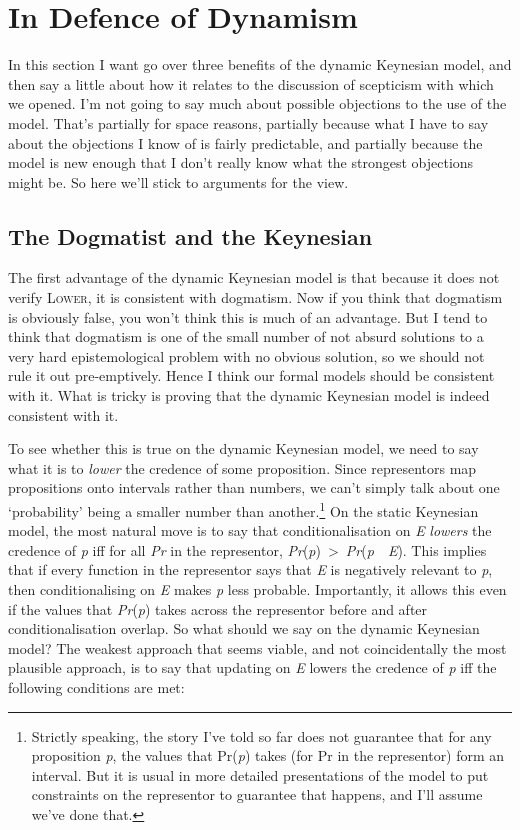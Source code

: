 \documentclass[
  11pt,
  letterpaper,
  DIV=11,
  numbers=noendperiod,
  oneside]{scrartcl}
\begin{document}
\section{In Defence of Dynamism}\label{in-defence-of-dynamism}

In this section I want go over three benefits of the dynamic Keynesian
model, and then say a little about how it relates to the discussion of
scepticism with which we opened. I'm not going to say much about
possible objections to the use of the model. That's partially for space
reasons, partially because what I have to say about the objections I
know of is fairly predictable, and partially because the model is new
enough that I don't really know what the strongest objections might be.
So here we'll stick to arguments for the view.

\subsection{The Dogmatist and the
Keynesian}\label{the-dogmatist-and-the-keynesian}

The first advantage of the dynamic Keynesian model is that because it
does not verify \textsc{Lower}, it is consistent with dogmatism. Now if
you think that dogmatism is obviously false, you won't think this is
much of an advantage. But I tend to think that dogmatism is one of the
small number of not absurd solutions to a very hard epistemological
problem with no obvious solution, so we should not rule it out
pre-emptively. Hence I think our formal models should be consistent with
it. What is tricky is proving that the dynamic Keynesian model is indeed
consistent with it.

To see whether this is true on the dynamic Keynesian model, we need to
say what it is to \emph{lower} the credence of some proposition. Since
representors map propositions onto intervals rather than numbers, we
can't simply talk about one `probability' being a smaller number than
another.\footnote{Strictly speaking, the story I've told so far does not
  guarantee that for any proposition \emph{p}, the values that
  Pr(\emph{p}) takes (for Pr in the representor) form an interval. But
  it is usual in more detailed presentations of the model to put
  constraints on the representor to guarantee that happens, and I'll
  assume we've done that.} On the static Keynesian model, the most
natural move is to say that conditionalisation on \emph{E} \emph{lowers}
the credence of \emph{p} iff for all \emph{Pr} in the representor,
\emph{Pr}(\emph{p})~\textgreater~\emph{Pr}(\emph{p}~~\emph{E}). This
implies that if every function in the representor says that \emph{E} is
negatively relevant to \emph{p}, then conditionalising on \emph{E} makes
\emph{p} less probable. Importantly, it allows this even if the values
that \emph{Pr}(\emph{p}) takes across the representor before and after
conditionalisation overlap. So what should we say on the dynamic
Keynesian model? The weakest approach that seems viable, and not
coincidentally the most plausible approach, is to say that updating on
\emph{E} lowers the credence of \emph{p} iff the following conditions
are met:
\end{document}
